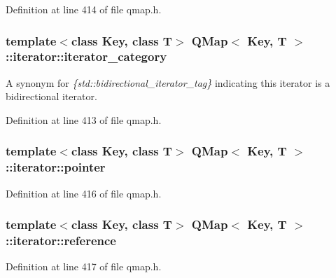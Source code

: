 Definition at line 414 of file qmap.\+h.

\subsubsection[{\texorpdfstring{iterator\+\_\+category}{iterator_category}}]{\setlength{\rightskip}{0pt plus 5cm}template$<$class Key, class T$>$ {\bf Q\+Map}$<$ Key, T $>$\+::{\bf iterator\+::iterator\+\_\+category}}\hypertarget{class_q_map_1_1iterator_aade380a34ce9c85a059175d414dbcc92}{}\label{class_q_map_1_1iterator_aade380a34ce9c85a059175d414dbcc92}
A synonym for {\itshape \{std\+::bidirectional\+\_\+iterator\+\_\+tag\}} indicating this iterator is a bidirectional iterator. 

Definition at line 413 of file qmap.\+h.

\subsubsection[{\texorpdfstring{pointer}{pointer}}]{\setlength{\rightskip}{0pt plus 5cm}template$<$class Key, class T$>$ {\bf Q\+Map}$<$ Key, T $>$\+::{\bf iterator\+::pointer}}\hypertarget{class_q_map_1_1iterator_ab385357a5b2a2018f1cfa855da8e9285}{}\label{class_q_map_1_1iterator_ab385357a5b2a2018f1cfa855da8e9285}


Definition at line 416 of file qmap.\+h.

\subsubsection[{\texorpdfstring{reference}{reference}}]{\setlength{\rightskip}{0pt plus 5cm}template$<$class Key, class T$>$ {\bf Q\+Map}$<$ Key, T $>$\+::{\bf iterator\+::reference}}\hypertarget{class_q_map_1_1iterator_a51f731d0504f52859c209e708567f0ca}{}\label{class_q_map_1_1iterator_a51f731d0504f52859c209e708567f0ca}


Definition at line 417 of file qmap.\+h.

